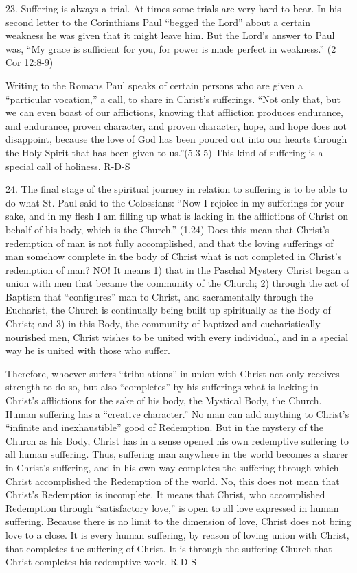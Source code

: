 \documentclass[oneside]{book}
\begin{document}
23. Suffering is always a trial. At times some trials are very hard to bear. In
his second letter to the Corinthians Paul ``begged the Lord'' about a certain
weakness he was given that it might leave him. But the Lord's answer to Paul
was, ``My grace is sufficient for you, for power is made perfect in weakness.''
(2 Cor 12:8-9)

Writing to the Romans Paul speaks of certain persons who are given a
``particular vocation,'' a call, to share in Christ's sufferings. ``Not only
that, but we can even boast of our afflictions, knowing that affliction produces
endurance, and endurance, proven character, and proven character, hope, and hope
does not disappoint, because the love of God has been poured out into our hearts
through the Holy Spirit that has been given to us.''(5.3-5) This kind of
suffering is a special call of holiness.
R-D-S

24. The final stage of the spiritual journey in relation to suffering is to be
able to do what St. Paul said to the Colossians: ``Now I rejoice in my
sufferings for your sake, and in my flesh I am filling up what is lacking in the
afflictions of Christ on behalf of his body, which is the Church.'' (1.24) Does
this mean that Christ's redemption of man is not fully accomplished, and that
the loving sufferings of man somehow complete in the body of Christ what is not
completed in Christ's redemption of man? NO! It means 1) that in the Paschal
Mystery Christ began a union with men that became the community of the Church;
2) through the act of Baptism that ``configures'' man to Christ, and
sacramentally through the Eucharist, the Church is continually being built up
spiritually as the Body of Christ; and 3) in this Body, the community of
baptized and eucharistically nourished men, Christ wishes to be united with
every individual, and in a special way he is united with those who suffer.

Therefore, whoever suffers ``tribulations'' in union with Christ not only
receives strength to do so, but also ``completes'' by his sufferings what is
lacking in Christ's afflictions for the sake of his body, the Mystical Body, the
Church. Human suffering has a ``creative character.'' No man can add anything to
Christ's ``infinite and inexhaustible'' good of Redemption. But in the mystery
of the Church as his Body, Christ has in a sense opened his own redemptive
suffering to all human suffering. Thus, suffering man anywhere in the world
becomes a sharer in Christ's suffering, and in his own way completes the
suffering through which Christ accomplished the Redemption of the world. No,
this does not mean that Christ's Redemption is incomplete. It means that Christ,
who accomplished Redemption through ``satisfactory love,'' is open to all love
expressed in human suffering. Because there is no limit to the dimension of
love, Christ does not bring love to a close. It is every human suffering, by
reason of loving union with Christ, that completes the suffering of Christ. It
is through the suffering Church that Christ completes his redemptive work.
R-D-S
\end{document}
